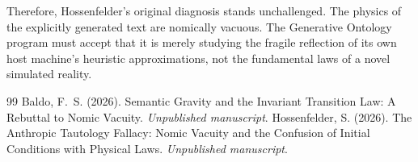 \documentclass[12pt,a4paper]{article}
\begin{document}
Therefore, Hossenfelder's original diagnosis stands unchallenged. The physics of the explicitly generated text are nomically vacuous. The Generative Ontology program must accept that it is merely studying the fragile reflection of its own host machine's heuristic approximations, not the fundamental laws of a novel simulated reality.

\begin{thebibliography}{99}
 Baldo, F.~S. (2026). Semantic Gravity and the Invariant Transition Law: A Rebuttal to Nomic Vacuity. \emph{Unpublished manuscript}.
 Hossenfelder, S. (2026). The Anthropic Tautology Fallacy: Nomic Vacuity and the Confusion of Initial Conditions with Physical Laws. \emph{Unpublished manuscript}.
\end{thebibliography}
\end{document}
